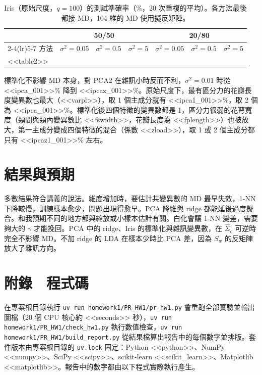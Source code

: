 \documentclass[10pt,a4paper]{article}
\begin{document}
\begin{table}[!htb]
\caption{Iris（原始尺度，$q=100$）的測試準確率（\%，20 次重複的平均）。各方法最後都接 MD，104 維的 MD 使用擬反矩陣。}
\centering\small
\begin{tabular}{lcccccc}
\toprule
& \multicolumn{3}{c}{50/50} & \multicolumn{3}{c}{20/80}\\
\cmidrule(lr){2-4}\cmidrule(lr){5-7}
方法 & $\sigma^2=0.05$ & $\sigma^2=0.5$ & $\sigma^2=5$ & $\sigma^2=0.05$ & $\sigma^2=0.5$ & $\sigma^2=5$\\
\midrule
<<table2>>
\bottomrule
\end{tabular}
\end{table}

標準化不影響 MD 本身，對 PCA2 在雜訊小時反而不利，$\sigma^2=0.01$ 時從 <<ipca_001>>\% 降到 <<ipcaz_001>>\%。原始尺度下，最有區分力的花瓣長度變異數也最大（<<varpl>>），取 1 個主成分就有 <<ipca1_001>>\%，取 2 個為 <<ipca_001>>\%。標準化後四個特徵的變異數都是 1，區分力很弱的花萼寬度（類間與類內變異數比 <<fswidth>>，花瓣長度為 <<fplength>>）也被放大，第一主成分變成四個特徵的混合（係數 <<zload>>），取 1 或 2 個主成分都只有 <<ipcaz1_001>>\% 左右。

\section{結果與預期}
\noindent 多數結果符合講義的說法。維度增加時，要估計共變異數的 MD 最早失效，1-NN 下降較慢，訓練樣本愈少，問題出現得愈早。PCA 降維與 ridge 都能延後過度擬合。和我預期不同的地方都與縮放或小樣本估計有關。白化會讓 1-NN 變差，需要夠大的 $\gamma$ 才能挽回。PCA 中的 ridge、Iris 的標準化與雜訊變異數，在 $\hat\Sigma_c$ 可逆時完全不影響 MD。不加 ridge 的 LDA 在樣本少時比 PCA 差，因為 $S_w$ 的反矩陣放大了雜訊方向。\label{body-end}

\clearpage
{}
\section*{附錄　程式碼}
\noindent 在專案根目錄執行 \texttt{uv run homework1/PR\_HW1/pr\_hw1.py} 會重跑全部實驗並輸出圖檔（20 個 CPU 核心約 <<seconds>> 秒），\texttt{uv run homework1/PR\_HW1/check\_hw1.py} 執行數值檢查，\texttt{uv run homework1/PR\_HW1/build\_report.py} 從結果檔算出報告中的每個數字並排版。套件版本由專案根目錄的 \texttt{uv.lock} 固定：Python <<python>>、NumPy <<numpy>>、SciPy <<scipy>>、scikit-learn <<scikit_learn>>、Matplotlib <<matplotlib>>。報告中的數字都由以下程式實際執行產生。
\end{document}
